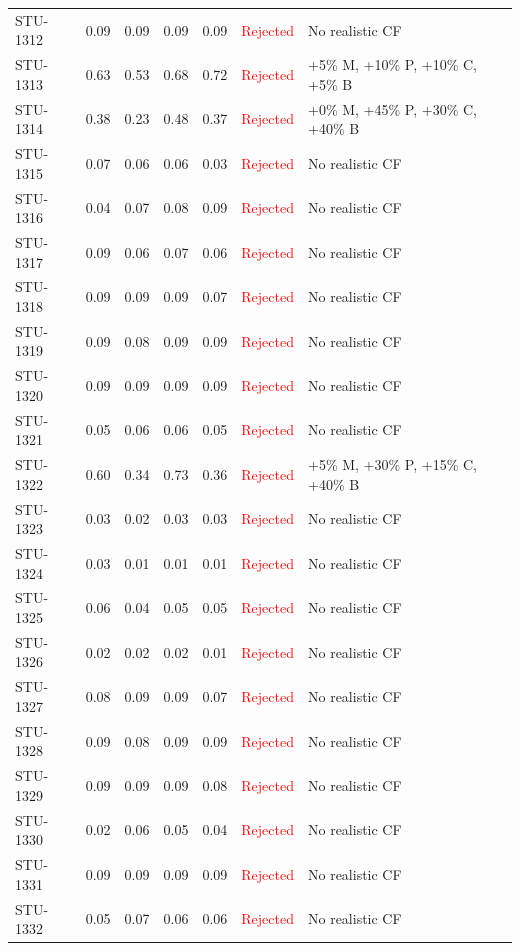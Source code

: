 \begin{longtable}{l c c c c | c | l}
STU-1312 & 0.09 & 0.09 & 0.09 & 0.09 & \textcolor{red}{Rejected} & No realistic CF \\
STU-1313 & 0.63 & 0.53 & 0.68 & 0.72 & \textcolor{red}{Rejected} & +5\% M, +10\% P, +10\% C, +5\% B \\
STU-1314 & 0.38 & 0.23 & 0.48 & 0.37 & \textcolor{red}{Rejected} & +0\% M, +45\% P, +30\% C, +40\% B \\
STU-1315 & 0.07 & 0.06 & 0.06 & 0.03 & \textcolor{red}{Rejected} & No realistic CF \\
STU-1316 & 0.04 & 0.07 & 0.08 & 0.09 & \textcolor{red}{Rejected} & No realistic CF \\
STU-1317 & 0.09 & 0.06 & 0.07 & 0.06 & \textcolor{red}{Rejected} & No realistic CF \\
STU-1318 & 0.09 & 0.09 & 0.09 & 0.07 & \textcolor{red}{Rejected} & No realistic CF \\
STU-1319 & 0.09 & 0.08 & 0.09 & 0.09 & \textcolor{red}{Rejected} & No realistic CF \\
STU-1320 & 0.09 & 0.09 & 0.09 & 0.09 & \textcolor{red}{Rejected} & No realistic CF \\
STU-1321 & 0.05 & 0.06 & 0.06 & 0.05 & \textcolor{red}{Rejected} & No realistic CF \\
STU-1322 & 0.60 & 0.34 & 0.73 & 0.36 & \textcolor{red}{Rejected} & +5\% M, +30\% P, +15\% C, +40\% B \\
STU-1323 & 0.03 & 0.02 & 0.03 & 0.03 & \textcolor{red}{Rejected} & No realistic CF \\
STU-1324 & 0.03 & 0.01 & 0.01 & 0.01 & \textcolor{red}{Rejected} & No realistic CF \\
STU-1325 & 0.06 & 0.04 & 0.05 & 0.05 & \textcolor{red}{Rejected} & No realistic CF \\
STU-1326 & 0.02 & 0.02 & 0.02 & 0.01 & \textcolor{red}{Rejected} & No realistic CF \\
STU-1327 & 0.08 & 0.09 & 0.09 & 0.07 & \textcolor{red}{Rejected} & No realistic CF \\
STU-1328 & 0.09 & 0.08 & 0.09 & 0.09 & \textcolor{red}{Rejected} & No realistic CF \\
STU-1329 & 0.09 & 0.09 & 0.09 & 0.08 & \textcolor{red}{Rejected} & No realistic CF \\
STU-1330 & 0.02 & 0.06 & 0.05 & 0.04 & \textcolor{red}{Rejected} & No realistic CF \\
STU-1331 & 0.09 & 0.09 & 0.09 & 0.09 & \textcolor{red}{Rejected} & No realistic CF \\
STU-1332 & 0.05 & 0.07 & 0.06 & 0.06 & \textcolor{red}{Rejected} & No realistic CF \\

\end{longtable}
